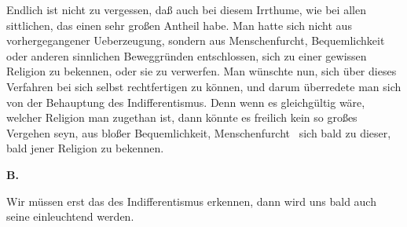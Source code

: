 \begin{aufza}
\item Endlich ist nicht zu vergessen, daß auch bei diesem Irrthume, wie bei allen sittlichen, das  einen sehr großen Antheil habe. Man hatte sich nicht aus vorhergegangener Ueberzeugung, sondern aus Menschenfurcht, Bequemlichkeit oder anderen sinnlichen Beweggründen entschlossen, sich zu einer gewissen Religion zu bekennen, oder sie zu verwerfen. Man wünschte nun, sich über dieses Verfahren bei sich selbst rechtfertigen zu können, und darum überredete man sich von der Behauptung des Indifferentismus. Denn wenn es gleichgültig wäre, welcher Religion man zugethan ist, dann könnte es freilich kein so großes Vergehen seyn, aus bloßer Bequemlichkeit, Menschenfurcht \udgl\ sich bald zu dieser, bald jener Religion zu bekennen.
\end{aufza}\par
\vabst \textbf{B.} ~\par
Wir müssen erst das  des Indifferentismus erkennen, dann wird uns bald auch seine  einleuchtend werden.
